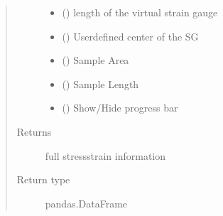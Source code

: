 \documentclass[letterpaper,10pt,english]{sphinxmanual}
\begin{document}
\begin{fulllineitems}
\begin{fulllineitems}
\begin{quote}
\begin{description}
\begin{itemize}
\item {} 
 () \textendash{} length of the virtual strain gauge

\item {} 
 (\sphinxstyleliteralemphasis{\sphinxupquote{{[}}}\sphinxstyleliteralemphasis{\sphinxupquote{, }}\sphinxstyleliteralemphasis{\sphinxupquote{, }}\sphinxstyleliteralemphasis{\sphinxupquote{{]}}}) \textendash{} User\sphinxhyphen{}defined center of the SG

\item {} 
 () \textendash{} Sample Area

\item {} 
 () \textendash{} Sample Length

\item {} 
 () \textendash{} Show/Hide progress bar

\end{itemize}

\item[{Returns}] \leavevmode
full stress\sphinxhyphen{}strain information

\item[{Return type}] \leavevmode
pandas.DataFrame


\end{description}
\end{quote}
\end{fulllineitems}
\end{fulllineitems}
\end{document}
